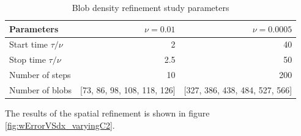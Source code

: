 \begin{table}[hbt]
\centering
	\begin{tabular}{|l|r|r|}
	\hline \textbf{Parameters} 	& \textbf{$\nu = 0.01$} & \textbf{$\nu = 0.0005$}\\
	\hline Start time $\tau/\nu$    & 2 & 40 \\				
	Stop time  $\tau/\nu$ 	& 2.5 & 50 \\
	Number of steps 			& 10 & 200 \\
	Number of blobs 			& [73, 86, 98, 108, 118, 126] & [327, 386, 438, 484, 527, 566]\\
	\hline
	\end{tabular}
\caption{Blob density refinement study parameters}
\label{tab:spatialRefinementParameters}	
\end{table}

The results of the spatial refinement is shown in figure \ref{fig:wErrorVSdx_varyingC2}. 

